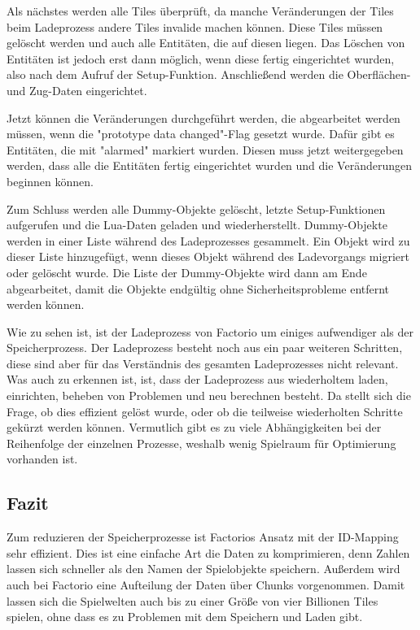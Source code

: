 Als nächstes werden alle Tiles überprüft, da manche Veränderungen der Tiles beim Ladeprozess andere Tiles invalide machen können. Diese Tiles müssen gelöscht werden und auch alle Entitäten, die auf diesen liegen. Das Löschen von Entitäten ist jedoch erst dann möglich, wenn diese fertig eingerichtet wurden, also nach dem Aufruf der Setup-Funktion. Anschließend werden die Oberflächen- und Zug-Daten eingerichtet.\cite{factorioGithubSaveLoad}

Jetzt können die Veränderungen durchgeführt werden, die abgearbeitet werden müssen, wenn die "prototype data changed"-Flag gesetzt wurde. Dafür gibt es Entitäten, die mit "alarmed" markiert wurden. Diesen muss jetzt weitergegeben werden, dass alle die Entitäten fertig eingerichtet wurden und die Veränderungen beginnen können.\cite{factorioGithubSaveLoad}

Zum Schluss werden alle Dummy-Objekte gelöscht, letzte Setup-Funktionen aufgerufen und die Lua-Daten geladen und wiederherstellt. Dummy-Objekte werden in einer Liste während des Ladeprozesses gesammelt. Ein Objekt wird zu dieser Liste hinzugefügt, wenn dieses Objekt während des Ladevorgangs migriert oder gelöscht wurde. Die Liste der Dummy-Objekte wird dann am Ende abgearbeitet, damit die Objekte endgültig ohne Sicherheitsprobleme entfernt werden können.\cite{factorioGithubSaveLoad}

Wie zu sehen ist, ist der Ladeprozess von Factorio um einiges aufwendiger als der Speicherprozess. Der Ladeprozess besteht noch aus ein paar weiteren Schritten, diese sind aber für das Verständnis des gesamten Ladeprozesses nicht relevant. Was auch zu erkennen ist, ist, dass der Ladeprozess aus wiederholtem laden, einrichten, beheben von Problemen und neu berechnen besteht. Da stellt sich die Frage, ob dies effizient gelöst wurde, oder ob die teilweise wiederholten Schritte gekürzt werden können. Vermutlich gibt es zu viele Abhängigkeiten bei der Reihenfolge der einzelnen Prozesse, weshalb wenig Spielraum für Optimierung vorhanden ist.



\subsection{Fazit}
Zum reduzieren der Speicherprozesse ist Factorios Ansatz mit der ID-Mapping sehr effizient. Dies ist eine einfache Art die Daten zu komprimieren, denn Zahlen lassen sich schneller als den Namen der Spielobjekte speichern. Außerdem wird auch bei Factorio eine Aufteilung der Daten über Chunks vorgenommen. Damit lassen sich die Spielwelten auch bis zu einer Größe von vier Billionen Tiles spielen, ohne dass es zu Problemen mit dem Speichern und Laden gibt.


